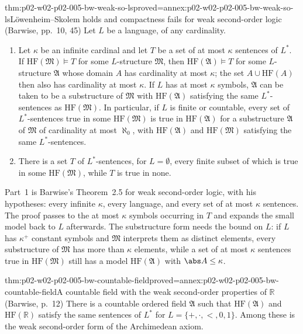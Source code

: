 \begin{hbtheorem}{thm:p02-w02-p02-005-bw-weak-so-ls}{proved=annex:p02-w02-p02-005-bw-weak-so-ls}{L\"owenheim--Skolem holds and compactness fails for weak second-order logic (Barwise, pp.~10, 45)}
Let \(L\) be a language, of any cardinality.
\begin{enumerate}
\item Let \(\kappa\) be an infinite cardinal and let \(T\) be a set of at
      most \(\kappa\) sentences of \(L^{*}\).  If
      \(\mathrm{HF}(\mathfrak M)\models T\) for some \(L\)-structure
      \(\mathfrak M\), then \(\mathrm{HF}(\mathfrak A)\models T\) for some
      \(L\)-structure \(\mathfrak A\) whose domain \(A\) has cardinality at
      most \(\kappa\); the set \(A\cup\mathrm{HF}(A)\) then also has
      cardinality at most \(\kappa\).  If \(L\) has at most \(\kappa\)
      symbols, \(\mathfrak A\) can be taken to be a substructure of
      \(\mathfrak M\) with \(\mathrm{HF}(\mathfrak A)\) satisfying the same
      \(L^{*}\)-sentences as \(\mathrm{HF}(\mathfrak M)\).  In particular, if
      \(L\) is finite or countable, every set of \(L^{*}\)-sentences true in
      some \(\mathrm{HF}(\mathfrak M)\) is true in \(\mathrm{HF}(\mathfrak A)\)
      for a substructure \(\mathfrak A\) of \(\mathfrak M\) of cardinality at
      most \(\aleph_0\), with \(\mathrm{HF}(\mathfrak A)\) and
      \(\mathrm{HF}(\mathfrak M)\) satisfying the same \(L^{*}\)-sentences.
\item There is a set \(T\) of \(L^{*}\)-sentences, for \(L=\emptyset\), every
      finite subset of which is true in some \(\mathrm{HF}(\mathfrak M)\),
      while \(T\) is true in none.
\end{enumerate}
\end{hbtheorem}

Part~1 is Barwise's Theorem~2.5 for weak second-order logic, with his
hypotheses: every infinite \(\kappa\), every language, and every set of at
most \(\kappa\) sentences.  The proof passes to the at most \(\kappa\)
symbols occurring in \(T\) and expands the small model back to \(L\)
afterwards.  The substructure form needs the bound on \(L\): if \(L\) has
\(\kappa^{+}\) constant symbols and \(\mathfrak M\) interprets them as
distinct elements, every substructure of \(\mathfrak M\) has more than
\(\kappa\) elements, while a set of at most \(\kappa\) sentences true in
\(\mathrm{HF}(\mathfrak M)\) still has a model \(\mathrm{HF}(\mathfrak A)\)
with \(\abs A\leq\kappa\).

\begin{hbcorollary}{thm:p02-w02-p02-005-bw-countable-field}{proved=annex:p02-w02-p02-005-bw-countable-field}{A countable field with the weak second-order properties of \(\mathbb R\) (Barwise, p.~12)}
There is a countable ordered field \(\mathfrak A\) such that
\(\mathrm{HF}(\mathfrak A)\) and \(\mathrm{HF}(\mathbb R)\) satisfy the same
sentences of \(L^{*}\) for \(L=\{+,\cdot,<,0,1\}\).  Among these is the
weak second-order form of the Archimedean axiom.
\end{hbcorollary}

